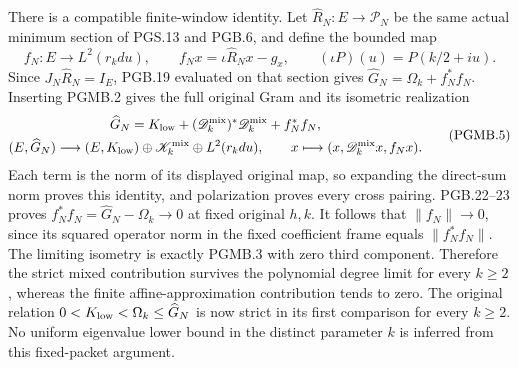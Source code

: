 There is a compatible finite-window identity. Let
$\widehat R_N:E\to\mathcal P_N$ be the same actual minimum
section of PGS.13 and PGB.6, and define the bounded map
\[
 f_N:E\longrightarrow L^2(r_kdu),\qquad
 f_Nx=\iota\widehat R_Nx-g_x,\qquad
 (\iota P)(u)=P(k/2+iu).
 \tag{PGMB.4}\label{GraphV2:eq:pgmb-finite-tail}
\]
Since $J_N\widehat R_N=I_E$, PGB.19 evaluated on that section
gives $\widehat G_N=\Omega_k+f_N^*f_N$. Inserting PGMB.2
gives the full original Gram and its isometric realization
\[
 \begin{gathered}
 \widehat G_N=K_{\rm low}
       +(\mathscr D_k^{\rm mix})^*\mathscr D_k^{\rm mix}+f_N^*f_N,\\
 (E,\widehat G_N)\longrightarrow
 (E,K_{\rm low})\oplus\mathscr K_k^{\rm mix}\oplus L^2(r_kdu),
 \qquad x\longmapsto(x,\mathscr D_k^{\rm mix}x,f_Nx).
 \end{gathered}
 \tag{PGMB.5}\label{GraphV2:eq:pgmb-three-term-isometry}
\]
Each term is the norm of its displayed original map, so expanding
the direct-sum norm proves this identity, and polarization
proves every cross pairing. PGB.22--23 proves
$f_N^*f_N=\widehat G_N-\Omega_k\to0$ at fixed original $h,k$.
It follows that $\|f_N\|\to0$, since its squared operator norm
in the fixed coefficient frame equals $\|f_N^*f_N\|$.
The limiting isometry is exactly PGMB.3 with zero third
component. Therefore the strict mixed contribution survives
the polynomial degree limit for every $k\geq2$, whereas the
finite affine-approximation contribution tends to zero.
The original relation $0<K_{\rm low}<\Omega_k\leq\widehat G_N$
is now strict in its first comparison for every $k\geq2$.
No uniform eigenvalue lower bound in the distinct parameter
$k$ is inferred from this fixed-packet argument.

